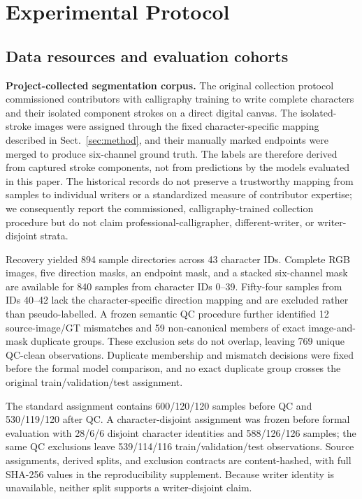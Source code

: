 \section{Experimental Protocol}
\label{sec:protocol}

\subsection{Data resources and evaluation cohorts}

\noindent\textbf{Project-collected segmentation corpus.}
The original collection protocol commissioned contributors with calligraphy
training to write complete characters and their isolated component strokes on
a direct digital canvas. The isolated-stroke images were assigned through the
fixed character-specific mapping described in Sect.~\ref{sec:method}, and
their manually marked endpoints were merged to produce six-channel ground
truth. The labels are therefore derived from captured stroke components, not
from predictions by the models evaluated in this paper. The historical
records do not preserve a trustworthy mapping from samples to individual
writers or a standardized measure of contributor expertise; we consequently
report the commissioned, calligraphy-trained collection procedure but do not
claim professional-calligrapher, different-writer, or writer-disjoint
strata.

Recovery yielded 894 sample directories across 43 character IDs. Complete
RGB images, five direction masks, an endpoint mask, and a stacked six-channel
mask are available for 840 samples from character IDs 0--39. Fifty-four
samples from IDs 40--42 lack the character-specific direction mapping and are
excluded rather than pseudo-labelled. A frozen semantic QC procedure further
identified 12 source-image/GT mismatches and 59 non-canonical members of exact
image-and-mask duplicate groups. These exclusion sets do not overlap, leaving
769 unique QC-clean observations. Duplicate membership and mismatch decisions
were fixed before the formal model comparison, and no exact duplicate group
crosses the original train/validation/test assignment.

The standard assignment contains 600/120/120 samples before QC and
530/119/120 after QC. A character-disjoint assignment was frozen before
formal evaluation with 28/6/6 disjoint character identities and
588/126/126 samples; the same QC exclusions leave 539/114/116
train/validation/test observations. Source assignments, derived splits, and
exclusion contracts are content-hashed, with full SHA-256 values in the
reproducibility supplement. Because writer identity is unavailable, neither
split supports a writer-disjoint claim.

